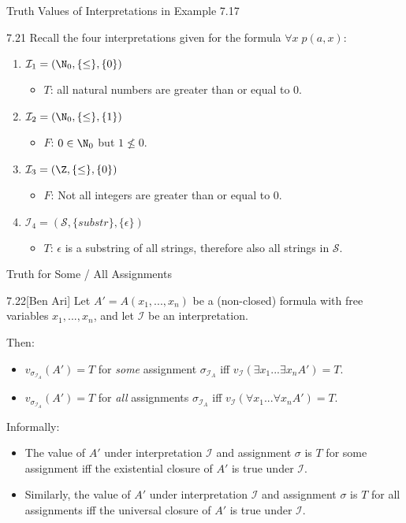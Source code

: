 \begin{wideslide}[bm=,toc=]{Truth Values of Interpretations in Example 7.17}
\begin{ex}{7.21}
Recall the four interpretations given for the formula $\forall x \; p(a,x)$:
\end{ex}
\vspace*{-2ex}
\begin{enumerate}
\item<2-> $\mathcal{I}_1 = (\N_0,\{\leq\},\{0\})$
\begin{itemize}
\item<3-> $T$: all natural numbers are greater than or equal to $0$.
\end{itemize}
\item<4-> $\mathcal{I}_2 = (\N_0,\{\leq\},\{1\})$
\begin{itemize}
\item<5-> $F$: $0 \in \N_0$ but $1 \not \leq 0$. 
\end{itemize}
\item<6-> $\mathcal{I}_3 = (\Z,\{\leq\},\{0\})$
\begin{itemize}
\item<7-> $F$: Not all integers are greater than or equal to $0$.
\end{itemize}
\item<8-> $\mathcal{I}_4 = (\mathcal{S},\{substr\},\{ \epsilon \})$
\begin{itemize}
\item<9-> $T$: $\epsilon$ is a substring of all strings, therefore also all
strings in $\mathcal{S}$. 
\end{itemize}
\end{enumerate}
\end{wideslide}

\begin{wideslide}[bm=,toc=]{Truth for Some / All Assignments}
\begin{thm}{7.22}[Ben Ari]
Let $A' = A(x_1,...,x_n)$ be a (non-closed) formula with free variables
$x_1,...,x_n$, and let $\mathcal{I}$ be an interpretation. 
\end{thm}
\pause
Then:
\begin{itemize}
\item<3-> $v_{\sigma_{\mathcal{I}_A}}(A') = T$ for \emph{some} assignment $\sigma_{\mathcal{I}_A}$ iff $v_{\mathcal{I}}(\exists x_1 ... \exists x_n A') = T$.
\item<4-> $v_{\sigma_{\mathcal{I}_A}}(A') = T$ for \emph{all} assignments
$\sigma_{\mathcal{I}_A}$ iff $v_{\mathcal{I}}(\forall x_1 ... \forall x_n A') = T$.
\end{itemize}
\pause[3]
Informally:
\begin{itemize}
\item<6-> The value of $A'$ under interpretation $\mathcal{I}$ and assignment
$\sigma$ is $T$ for some assignment iff the existential closure of $A'$ is true 
under $\mathcal{I}$. 
\item<7-> Similarly, the value of $A'$ under interpretation $\mathcal{I}$ and assignment
$\sigma$ is $T$ for all assignments iff the universal closure of $A'$ is true 
under $\mathcal{I}$. 
\end{itemize}
\end{wideslide}


